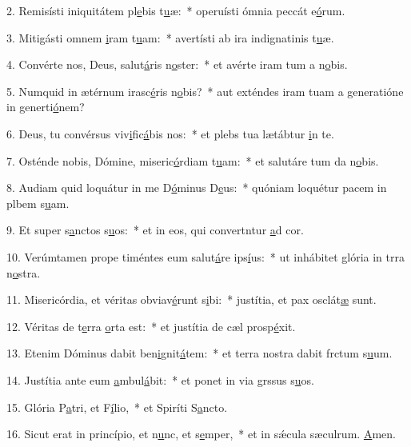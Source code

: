 2. Remisísti iniquitátem pl\uline{e}bis t\uline{u}æ:~* operuísti ómnia peccát e\uline{ó}rum.\par 
3. Mitigásti omnem \uline{i}ram t\uline{u}am:~* avertísti ab ira indignatinis t\uline{u}æ.\par 
4. Convérte nos, Deus, salut\uline{á}ris n\uline{o}ster:~* et avérte iram tum a n\uline{o}bis.\par 
5. Numquid in ætérnum irasc\uline{é}ris n\uline{o}bis?~* aut exténdes iram tuam a generatióne in generti\uline{ó}nem?\par 
6. Deus, tu convérsus viv\uline{i}fic\uline{á}bis nos:~* et plebs tua lætábtur \uline{i}n te.\par 
7. Osténde nobis, Dómine, miseric\uline{ó}rdiam t\uline{u}am:~* et salutáre tum da n\uline{o}bis.\par 
8. Audiam quid loquátur in me D\uline{ó}minus D\uline{e}us:~* quóniam loquétur pacem in plbem s\uline{u}am.\par 
9. Et super s\uline{a}nctos s\uline{u}os:~* et in eos, qui convertntur \uline{a}d cor.\par 
10. Verúmtamen prope timéntes eum salut\uline{á}re ips\uline{í}us:~* ut inhábitet glória in trra n\uline{o}stra.\par 
11. Misericórdia, et véritas obviav\uline{é}runt s\uline{i}bi:~* justítia, et pax osclát\uline{æ} sunt.\par 
12. Véritas de t\uline{e}rra \uline{o}rta est:~* et justítia de cæl prosp\uline{é}xit.\par 
13. Etenim Dóminus dabit ben\uline{i}gnit\uline{á}tem:~* et terra nostra dabit frctum s\uline{u}um.\par 
14. Justítia ante eum \uline{a}mbul\uline{á}bit:~* et ponet in via grssus s\uline{u}os.\par 
15. Glória P\uline{a}tri, et F\uline{í}lio,~* et Spiríti S\uline{a}ncto.\par 
16. Sicut erat in princípio, et n\uline{u}nc, et s\uline{e}mper,~* et in sǽcula sæculrum. \uline{A}men.\par 
